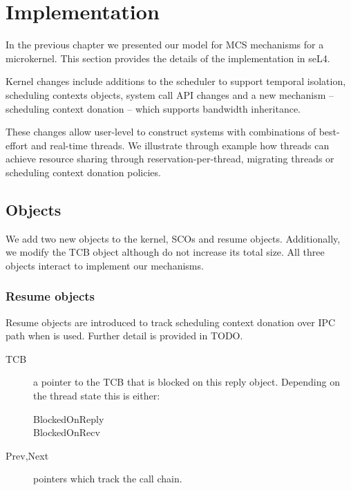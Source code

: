 \chapter{Implementation}
\label{chap:implementation}


In the previous chapter we presented our model for MCS mechanisms for a microkernel.
This section provides the details of the implementation in seL4.


Kernel changes include additions to the scheduler to support temporal isolation, scheduling contexts
objects, system call API changes and a new mechanism -- scheduling context donation -- which supports bandwidth inheritance.

These changes allow user-level to construct systems with combinations of best-effort and real-time threads.
We illustrate through example how threads can achieve resource sharing through reservation-per-thread, migrating threads or scheduling context donation policies.



\section{Objects}

We add two new objects to the kernel, \glspl{SCO} and resume objects. Additionally, we modify
the \gls{TCB} object although do not increase its total size. All three objects interact to
implement our mechanisms.

\subsection{Resume objects}
\label{s:resume}

Resume objects are introduced to track scheduling context donation over IPC path when \call is
used. Further detail is provided in TODO.

\begin{description}
    \item[TCB] a pointer to the \gls{TCB} that is blocked on this reply object. Depending on the
        thread state this is either: 
        \begin{description}
            \item [BlockedOnReply]
            \item [BlockedOnRecv]
        \end{description}
    \item[Prev,Next] pointers which track the call chain.
\end{description}

